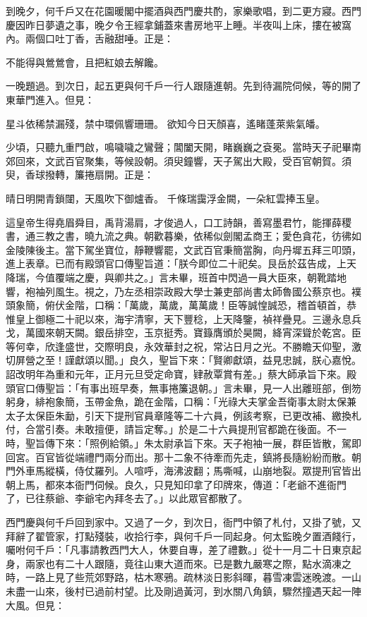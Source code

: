 到晚夕，何千戶又在花園暖閣中擺酒與西門慶共酌，家樂歌唱，到二更方寢。西門慶因昨日夢遺之事，晚夕令王經拿鋪蓋來書房地平上睡。半夜叫上床，摟在被窩內。兩個口吐丁香，舌融甜唾。正是：

不能得與鶯鶯會，且把紅娘去解饞。

一晚題過。到次日，起五更與何千戶一行人跟隨進朝。先到待漏院伺候，等的開了東華門進入。但見：

星斗依稀禁漏殘，禁中環佩響珊珊。
欲知今日天顏喜，遙睹蓬萊紫氣皤。

少頃，只聽九重門啟，鳴噦噦之鸞聲；閶闔天開，睹巍巍之袞冕。當時天子祀畢南郊回來，文武百官聚集，等候設朝。須臾鐘響，天子駕出大殿，受百官朝賀。須臾，香球撥轉，簾捲扇開。正是：

晴日明開青鎖闥，天風吹下御爐香。
千條瑞靄浮金闕，一朵紅雲捧玉皇。

這皇帝生得堯眉舜目，禹背湯肩，才俊過人，口工詩韻，善寫墨君竹，能揮薛稷書，通三教之書，曉九流之典。朝歡暮樂，依稀似劍閣孟商王；愛色貪花，彷彿如金陵陳後主。當下駕坐寶位，靜鞭響罷，文武百官秉簡當胸，向丹墀五拜三叩頭，進上表章。已而有殿頭官口傳聖旨道：「朕今即位二十祀矣。艮岳於茲告成，上天降瑞，今值覆端之慶，與卿共之。」言未畢，班首中閃過一員大臣來，朝靴踏地響，袍袖列風生。視之，乃左丞相崇政殿大學士兼吏部尚書太師魯國公蔡京也。襆頭象簡，俯伏金階，口稱：「萬歲，萬歲，萬萬歲！臣等誠惶誠恐，稽首頓首，恭惟皇上御極二十祀以來，海宇清寧，天下豐稔，上天降鑒，禎祥疊見。三邊永息兵戈，萬國來朝天闕。銀岳排空，玉京挺秀。寶籙膺頒於昊闕，絳宵深聳於乾宮。臣等何幸，欣逢盛世，交際明良，永效華封之祝，常沾日月之光。不勝瞻天仰聖，激切屏營之至！謹獻頌以聞。」良久，聖旨下來：「賢卿獻頌，益見忠誠，朕心嘉悅。詔改明年為重和元年，正月元旦受定命寶，肄赦覃賞有差。」蔡大師承旨下來。殿頭官口傳聖旨：「有事出班早奏，無事捲簾退朝。」言未畢，見一人出離班部，倒笏躬身，緋袍象簡，玉帶金魚，跪在金階，口稱：「光祿大夫掌金吾衛事太尉太保兼太子太保臣朱勔，引天下提刑官員章隆等二十六員，例該考察，已更改補、繳換札付，合當引奏。未敢擅便，請旨定奪。」於是二十六員提刑官都跪在後面。不一時，聖旨傳下來：「照例給領。」朱太尉承旨下來。天子袍袖一展，群臣皆散，駕即回宮。百官皆從端禮門兩分而出。那十二象不待牽而先走，鎮將長隨紛紛而散。朝門外車馬縱橫，侍仗羅列。人喧呼，海沸波翻；馬嘶喊，山崩地裂。眾提刑官皆出朝上馬，都來本衙門伺候。良久，只見知印拿了印牌來，傳道：「老爺不進衙門了，已往蔡爺、李爺宅內拜冬去了。」以此眾官都散了。

西門慶與何千戶回到家中。又過了一夕，到次日，衙門中領了札付，又掛了號，又拜辭了翟管家，打點殘裝，收拾行李，與何千戶一同起身。何太監晚夕置酒餞行，囑咐何千戶：「凡事請教西門大人，休要自專，差了禮數。」從十一月二十日東京起身，兩家也有二十人跟隨，竟往山東大道而來。已是數九嚴寒之際，點水滴凍之時，一路上見了些荒郊野路，枯木寒鴉。疏林淡日影斜暉，暮雪凍雲迷晚渡。一山未盡一山來，後村已過前村望。比及剛過黃河，到水關八角鎮，驟然撞遇天起一陣大風。但見：

